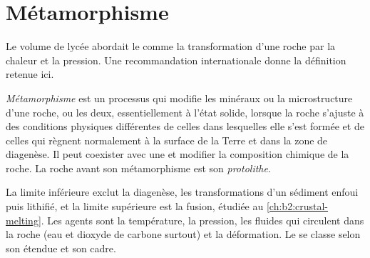 \section{Métamorphisme}\label{sec:b2:metamorphic-facies:metamorphism}

Le volume de lycée abordait le  comme la transformation d'une roche par la chaleur et
la pression. Une recommandation internationale donne la définition retenue ici.

\begin{definition}\label{def:b2:metamorphic-facies:metamorphism}
\emph{Métamorphisme} est un processus qui modifie les minéraux ou la
microstructure d'une roche, ou les deux, essentiellement à l'état solide, lorsque la roche s'ajuste
à des conditions physiques différentes de celles dans lesquelles elle s'est formée et de celles
qui règnent normalement à la surface de la Terre et dans la zone de diagenèse. Il peut coexister avec
une  et modifier la composition chimique de la roche. La roche avant
son métamorphisme est son \emph{protolithe}.
\end{definition}

La limite inférieure exclut la diagenèse, les transformations d'un sédiment enfoui puis
lithifié, et la limite supérieure est la fusion, étudiée au \cref{ch:b2:crustal-melting}. Les
agents sont la température, la pression, les fluides qui circulent dans la roche (eau et
dioxyde de carbone surtout) et la déformation. Le  se classe selon son étendue et
son cadre.

